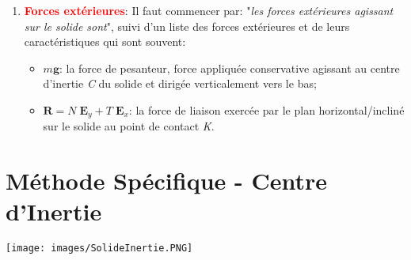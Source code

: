 \documentclass[a4paper]{article}
\begin{document}
\begin{enumerate}
\item \textcolor{red}{\textbf{Forces extérieures}}: Il faut commencer par: "\textit{les forces extérieures agissant sur le solide sont}", suivi d'un liste des forces extérieures et de leurs caractéristiques qui sont souvent:
\begin{itemize}
    \item $ m \textbf{g} $: la force de pesanteur, force appliquée conservative agissant au centre d’inertie \emph{C} du solide et dirigée verticalement vers le bas;
    \item $ \textbf{R} = N \; \textbf{E}_y + T \; \textbf{E}_x $: la force de liaison exercée par le plan horizontal/incliné sur le solide au point de contact \emph{K}.
\end{itemize}





\end{enumerate}










\section{Méthode Spécifique - Centre d'Inertie}





\begin{center}
\texttt{[image: images/SolideInertie.PNG]}
\end{center}
\end{document}

